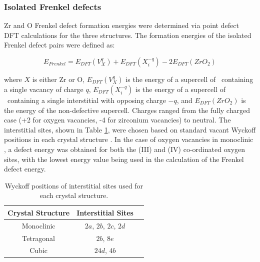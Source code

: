 \subsubsection*{Isolated Frenkel defects}

Zr and O Frenkel defect formation energies were determined via point defect DFT calculations for the three structures. The formation energies of the isolated Frenkel defect pairs were defined as:

\begin{equation}
\label{equation_frenkel}
E_{Frenkel} = E_{DFT}(V^{q}_{X}) + E_{DFT}(X^{-q}_{i}) - 2E_{DFT}(ZrO_2)%
\end{equation}

where $X$ is either Zr or O, $E_{DFT}(V^{q}_{X})$ is the energy of a supercell of \zirconia\ containing a single vacancy of charge $q$, $E_{DFT}(X^{-q}_{i})$ is the energy of a supercell of \zirconia\ containing a single interstitial with opposing charge $-q$, and $E_{DFT}(ZrO_2)$ is the energy of the non-defective supercell. Charges ranged from the fully charged case (+2 for oxygen vacancies, -4 for zirconium vacancies) to neutral. The interstitial sites, shown in Table \ref{table:interstitials}, were chosen based on standard vacant Wyckoff positions in each crystal structure \cite{theo1996international}.  In the case of oxygen vacancies in monoclinic \zirconia , a defect energy was obtained for both the (III) and (IV) co-ordinated oxygen sites, with the lowest energy value being used in the calculation of the Frenkel defect energy.

\begin{table}[htp] %
\onehalfspacing
\centering
\caption{Wyckoff positions of interstitial sites used for each crystal structure.}
\label{table:interstitials}
\begin{tabular}{lcc}
\hline
\hspace{0.7 cm} {\bf Crystal Structure} \hspace{0.7 cm}                              & \hspace{0.7 cm} {\bf Interstitial Sites} \hspace{0.7 cm}                                               \\ \hline
\multicolumn{1}{c}{Monoclinic}              & $2a$, $2b$, $2c$, $2d$ \\
\multicolumn{1}{c}{Tetragonal}            & $2b$, $8e$                                   \\
\multicolumn{1}{c}{Cubic}       & $24d$, $4b$                                          \\ \hline
\end{tabular}
\end{table}


